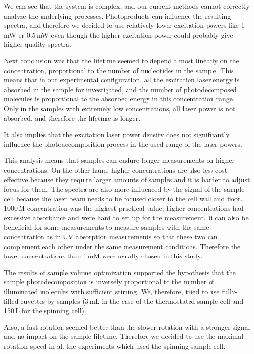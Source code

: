 We can see that the system is complex, and our current methods cannot correctly
analyze the underlying processes.
Photoproducts can influence the resulting spectra, and therefore we
decided to use relatively lower excitation powers like 1\,mW or 0.5\,mW even
though the higher excitation power could probably give higher quality spectra.

Next conclusion was that the lifetime seemed to depend almost linearly on
the concentration, proportional to the number of nucleotides in the sample.
This means that in our experimental configuration, all the
excitation laser energy is absorbed in the sample for investigated, and
the number of photodecomposed molecules is proportional to the absorbed
energy in this concentration range.
Only in the samples with extremely low concentrations, all laser power is not
absorbed, and therefore the lifetime is longer.

It also implies that the excitation laser power density does not significantly
influence the photodecomposition process in the used range of the laser powers.

This analysis means that samples can endure longer measurements on higher
concentrations.
On the other hand, higher concentrations are also less cost-effective because
they require larger amounts of samples and it is harder to adjust focus for
them.
The spectra are also more influenced by the signal of the sample cell
because the laser beam needs to be focused closer to the cell wall and floor.
1000\,M concentration was the highest practical value; higher
concentrations had excessive absorbance and were hard to set up for the
measurement.
It can also be beneficial for some measurements to measure samples with the
same concentration as in UV absorption measurements so that these two can
complement each other under the same measurement conditions.
Therefore the lower concentrations than 1\,mM were usually chosen in this
study.

The results of sample volume optimization supported the hypothesis that the
sample photodecomposition is inversely proportional to the number of
illuminated molecules with sufficient stirring.
We, therefore, tried to use fully-filled cuvettes by samples (3\,mL in the case
of the thermostated sample cell and 150\,L for the spinning cell).

Also, a fast rotation seemed better than the slower rotation with a
stronger signal and no impact on the sample lifetime.
Therefore we decided to use the maximal rotation speed in all the experiments
which used the spinning sample cell.

